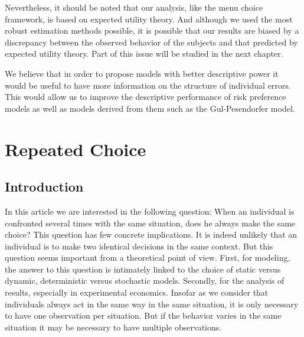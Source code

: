 \documentclass[
]{book}
\begin{document}
Nevertheless, it should be noted that our analysis, like the menu choice
framework, is based on expected utility theory.
And although we used the most robust estimation methods possible, it is possible
that our results are biased by a discrepancy between the observed behavior of
the subjects and that predicted by expected utility theory.
Part of this issue will be studied in the next chapter.

We believe that in order to propose models with better descriptive power it
would be useful to have more information on the structure of individual errors.
This would allow us to improve the descriptive performance of risk preference
models as well as models derived from them such as the Gul-Pesendorfer model.

\hypertarget{multi-choice}{%
\chapter{Repeated Choice}\label{multi-choice}}

\hypertarget{intro4}{%
\section{Introduction}\label{intro4}}

In this article we are interested in the following question: When an
individual is confronted several times with the same situation, does he
always make the same choice? This question has few concrete
implications. It is indeed unlikely that an individual is to make two
identical decisions in the same context. But this question seems
important from a theoretical point of view. First, for modeling, the
answer to this question is intimately linked to the choice of
static versus dynamic, deterministic versus stochastic models.
Secondly, for the analysis of results, especially in experimental
economics. Insofar as we consider that individuals always act in the
same way in the same situation, it is only necessary to have one
observation per situation. But if the behavior varies in the same
situation it may be necessary to have multiple observations.
\end{document}
